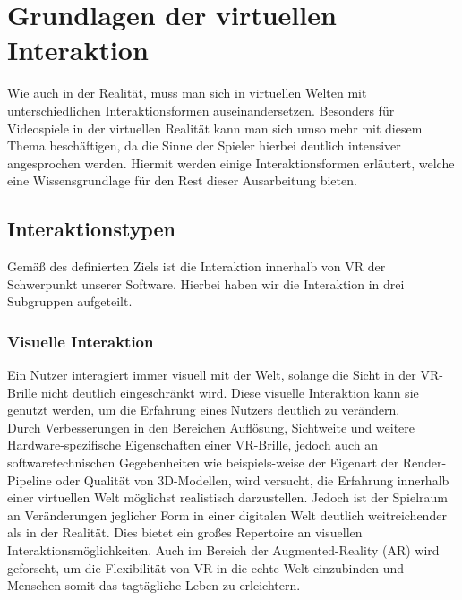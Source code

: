 \chapter{Grundlagen der virtuellen Interaktion}
Wie auch in der Realität, muss man sich in virtuellen Welten mit unterschiedlichen Interaktionsformen auseinandersetzen. Besonders für Videospiele in der virtuellen Realität kann man sich umso mehr mit diesem Thema beschäftigen, da die Sinne der Spieler hierbei deutlich intensiver angesprochen werden. Hiermit werden einige Interaktionsformen erläutert, welche eine Wissensgrundlage für den Rest dieser Ausarbeitung bieten.

\section{Interaktionstypen}
Gemäß des definierten Ziels ist die Interaktion innerhalb von VR der Schwerpunkt unserer Software. Hierbei haben wir die Interaktion in drei Subgruppen aufgeteilt.

\subsection{Visuelle Interaktion}
Ein Nutzer interagiert immer visuell mit der Welt, solange die Sicht in der VR-Brille nicht deutlich eingeschränkt wird. Diese visuelle Interaktion kann sie genutzt werden, um die Erfahrung eines Nutzers deutlich zu verändern.\\
\noindent Durch Verbesserungen in den Bereichen Auflösung, Sichtweite und weitere Hardware-spezifische Eigenschaften einer VR-Brille, jedoch auch an softwaretechnischen Gegebenheiten wie beispiels-weise der Eigenart der Render-Pipeline oder Qualität von 3D-Modellen, wird versucht, die Erfahrung innerhalb einer virtuellen Welt möglichst realistisch darzustellen. Jedoch ist der Spielraum an Veränderungen jeglicher Form in einer digitalen Welt deutlich weitreichender als in der Realität. Dies bietet ein großes Repertoire an visuellen Interaktionsmöglichkeiten. Auch im Bereich der Augmented-Reality (AR) wird geforscht, um die Flexibilität von VR in die echte Welt einzubinden und Menschen somit das tagtägliche Leben zu erleichtern.

